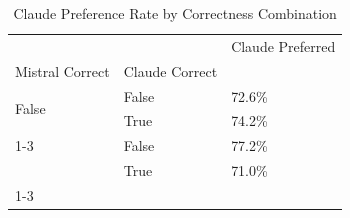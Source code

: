 \begin{table}[h]
\caption{Claude Preference Rate by Correctness Combination}
\label{tab:preference_by_correctness}
\begin{tabular}{lll}
\toprule
 &  & Claude Preferred \\
Mistral Correct & Claude Correct &  \\
\midrule
\multirow[t]{2}{*}{False} & False & 72.6\% \\
 & True & 74.2\% \\
\cline{1-3}
\multirow[t]{2}{*}{True} & False & 77.2\% \\
 & True & 71.0\% \\
\cline{1-3}
\bottomrule
\end{tabular}
\end{table}
